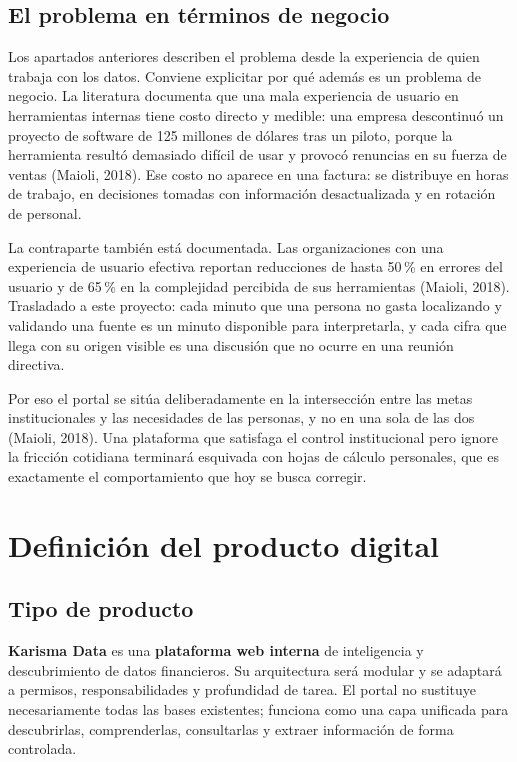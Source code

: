\subsection{El problema en términos de negocio}

Los apartados anteriores describen el problema desde la experiencia de quien trabaja con los
datos. Conviene explicitar por qué además es un problema de negocio. La literatura documenta
que una mala experiencia de usuario en herramientas internas tiene costo directo y medible:
una empresa descontinuó un proyecto de software de 125 millones de dólares tras un piloto,
porque la herramienta resultó demasiado difícil de usar y provocó renuncias en su fuerza de
ventas (Maioli, 2018). Ese costo no aparece en una factura: se distribuye en horas de
trabajo, en decisiones tomadas con información desactualizada y en rotación de personal.

La contraparte también está documentada. Las organizaciones con una experiencia de usuario
efectiva reportan reducciones de hasta 50\,\% en errores del usuario y de 65\,\% en la
complejidad percibida de sus herramientas (Maioli, 2018). Trasladado a este proyecto: cada
minuto que una persona no gasta localizando y validando una fuente es un minuto disponible
para interpretarla, y cada cifra que llega con su origen visible es una discusión que no
ocurre en una reunión directiva.

\begin{uxdestacado}
Por eso el portal se sitúa deliberadamente en la intersección entre las metas institucionales
y las necesidades de las personas, y no en una sola de las dos (Maioli, 2018). Una plataforma
que satisfaga el control institucional pero ignore la fricción cotidiana terminará esquivada
con hojas de cálculo personales, que es exactamente el comportamiento que hoy se busca
corregir.
\end{uxdestacado}

\section{Definición del producto digital}

\subsection{Tipo de producto}

\textbf{Karisma Data} es una \textbf{plataforma web interna} de inteligencia y descubrimiento
de datos financieros. Su arquitectura será modular y se adaptará a permisos, responsabilidades
y profundidad de tarea. El portal no sustituye necesariamente todas las bases existentes;
funciona como una capa unificada para descubrirlas, comprenderlas, consultarlas y extraer
información de forma controlada.

